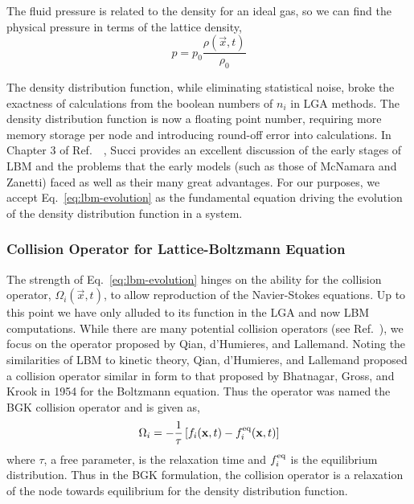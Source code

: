 The fluid pressure is related to the density for an ideal gas, so we can find the physical pressure in terms of the lattice density,
\begin{equation}
	p = p_0\frac{\rho(\vec{x},t)}{\rho_0}
\end{equation}

The density distribution function, while eliminating statistical noise, broke the exactness of calculations from the boolean numbers of $n_i$ in LGA methods. The density distribution function is now a floating point number, requiring more memory storage per node and introducing round-off error into calculations. In Chapter 3 of Ref.~\cite{succi2001lattice}~, Succi provides an excellent discussion of the early stages of LBM and the problems that the early models (such as those of McNamara and Zanetti) faced as well as their many great advantages. For our purposes, we accept Eq.~\ref{eq:lbm-evolution} as the fundamental equation driving the evolution of the density distribution function in a system.



\subsubsection{Collision Operator for Lattice-Boltzmann Equation}

The strength of Eq.~\ref{eq:lbm-evolution} hinges on the ability for the collision operator, $\Omega_i(\vec{x},t)$, to allow reproduction of the Navier-Stokes equations. Up to this point we have only alluded to its function in the LGA and now LBM computations. While there are many potential collision operators (see Ref.~\cite{succi2001lattice}), we focus on the operator proposed by Qian, d’Humieres, and Lallemand.\cite{qian1992lattice} Noting the similarities of LBM to kinetic theory, Qian, d'Humieres, and Lallemand proposed a collision operator similar in form to that proposed by Bhatnagar, Gross, and Krook in 1954 for the Boltzmann equation.\cite{Bhatnagar1954a} Thus the operator was named the BGK collision operator and is given as,
\begin{equation}\label{eq:bgk-operator}
	\Omega_i = -\frac{1}{\tau}\left[f_i(\mathbf{x},t) - f_i^{\text{eq}}(\mathbf{x},t)\right]
\end{equation}
where $\tau$, a free parameter, is the relaxation time and $f_i^{\text{eq}}$ is the equilibrium distribution. Thus in the BGK formulation, the collision operator is a relaxation of the node towards equilibrium for the density distribution function.\cite{Bhatnagar1954a}

